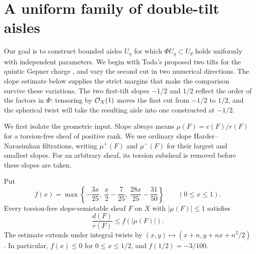 \section{A uniform family of double-tilt aisles}
\label{sec:aisles}

Our goal is to construct bounded aisles $U_\eta$ for which
$\Phi U_\eta\subset U_\theta$ holds uniformly with independent parameters.
We begin with Toda's proposed two tilts for the quintic Gepner charge
\cite[Sections~3.4--3.6]{TodaQuintic2013}, and vary the second cut in two
numerical directions. The slope estimate below supplies the strict margins
that make the comparison survive these variations.
The two first-tilt slopes $-1/2$ and $1/2$ reflect the order of the factors
in $\Phi$: tensoring by $\mathcal O_X(1)$ moves the first cut from $-1/2$ to
$1/2$, and the spherical twist will take the resulting aisle into one
constructed at $-1/2$.

We first isolate the geometric input.  Slope always means
$\mu(F)=c(F)/r(F)$ for a torsion-free sheaf of positive rank.  We use
ordinary slope Harder--Narasimhan filtrations, writing $\mu^+(F)$ and
$\mu^-(F)$ for their largest and smallest slopes.  For an arbitrary
sheaf, its torsion subsheaf is removed before these slopes are taken.

\begin{lemma}\label{lem:slope-input}
Put
\[
 f(x)=\max\left\{-\frac{3x}{25},\ \frac{x}{2}-\frac7{25},\
                    \frac{28x}{25}-\frac{31}{50}\right\}
                    \qquad(0\leq x\leq1).
\]
Every torsion-free slope-semistable sheaf $F$ on $X$ with
$|\mu(F)|\leq1$ satisfies
\begin{equation}\label{eq:slope-envelope}
                 \frac{d(F)}{r(F)}\leq f(|\mu(F)|).
\end{equation}
The estimate extends under integral twists by
$(x,y)\mapsto(x+n,y+nx+n^2/2)$.  In particular,
$f(x)\leq0$ for $0\leq x\leq1/2$, and $f(1/2)=-3/100$.
\end{lemma}

